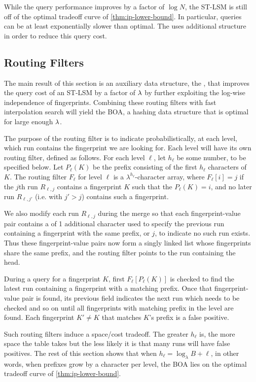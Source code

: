 While the query performance improves by a factor of $\log{N}$, the ST-LSM
is still off of the optimal tradeoff curve of \cref{thm:ip-lower-bound}. In
particular, queries can be at least exponentially slower than optimal. The
\boa{} uses additional structure in order to reduce this query cost.

\subsection{Routing Filters}\label{sec:boa-routing-filter}
The main result of this section is an auxiliary data structure, the
, that improves the query cost of an ST-LSM by a
factor of $\lambda$ by further exploiting the log-wise independence of
fingerprints.  Combining these routing filters with fast interpolation
search will yield the BOA, a hashing data structure that is optimal
for large enough $\lambda$. 

The purpose of the routing filter is to indicate probabilistically, at each
level, which run contains the fingerprint we are looking for. Each level will
have its own routing filter, defined as follows. For each level $\ell$, let
$h_\ell$ be some number, to be specified below. Let $P_\ell(K)$ be the prefix
consisting of the first $h_\ell$ characters of $K$. The routing filter $F_\ell$
for level $\ell$ is a $\lambda^{h_\ell}$-character array, where $F_\ell[i] = j$
if the $j$th run $R_{\ell,j}$ contains a fingerprint $K$ such that the
$P_\ell(K)=i$, and no later run $R_{\ell,j'}$ (i.e. with $j'>j$) contains such
a fingerprint.

We also modify each run $R_{\ell, j}$ during the merge so that each
fingerprint-value pair contains a  of 1 additional
character used to specify the previous run containing a fingerprint with the
same prefix, or $j$, to indicate no such run exists. Thus these fingerprint-value
pairs now form a singly linked list whose fingerprints share the same prefix,
and the routing filter points to the run containing the head.

During a query for a fingerprint $K$, first $F_\ell[P_\ell(K)]$ is checked to
find the latest run containing a fingerprint with a matching prefix. Once that
fingerprint-value pair is found, its previous field indicates the next run
which needs to be checked and so on until all fingerprints with matching prefix
in the level are found. Each fingerprint $K'\neq K$ that matches $K$'s prefix
is a false positive.

Such routing filters induce a space/cost tradeoff. The greater $h_\ell$ is, the
more space the table takes but the less likely it is that many runs will have
false positives. The rest of this section shows that when $h_\ell=\log_\lambda
B + \ell$, in other words, when prefixes grow by a character per level, the BOA
lies on the optimal tradeoff curve of \cref{thm:ip-lower-bound}.

